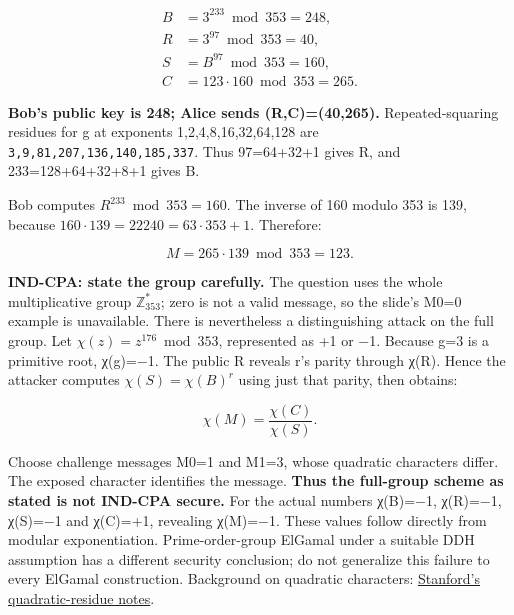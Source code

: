 \documentclass[11pt,a4paper]{article}
\begin{document}
\[
\begin{aligned}B&=3^{233}\bmod353=248,\\R&=3^{97}\bmod353=40,\\S&=B^{97}\bmod353=160,\\C&=123\cdot160\bmod353=265.\end{aligned}
\]

\textbf{Bob’s public key is 248; Alice sends (R,\allowbreak{}C)=\allowbreak{}(40,\allowbreak{}265).} Repeated-squaring residues for g at exponents 1,\allowbreak{}2,\allowbreak{}4,\allowbreak{}8,\allowbreak{}16,\allowbreak{}32,\allowbreak{}64,\allowbreak{}128 are \texttt{3,\allowbreak{}9,\allowbreak{}81,\allowbreak{}207,\allowbreak{}136,\allowbreak{}140,\allowbreak{}185,\allowbreak{}337}. Thus 97=\allowbreak{}64+32+1 gives R,\allowbreak{} and 233=\allowbreak{}128+64+32+8+1 gives B.


Bob computes \(R^{233}\bmod353=160\). The inverse of 160 modulo 353 is 139,\allowbreak{} because \(160\cdot139=22240=63\cdot353+1\). Therefore:



\[
M=265\cdot139\bmod353=123.
\]

\textbf{IND-CPA: state the group carefully.} The question uses the whole multiplicative group \(\mathbb Z_{353}^{*}\); zero is not a valid message,\allowbreak{} so the slide’s M0=\allowbreak{}0 example is unavailable. There is nevertheless a distinguishing attack on the full group. Let \(\chi(z)=z^{176}\bmod353\),\allowbreak{} represented as +1 or −1. Because g=\allowbreak{}3 is a primitive root,\allowbreak{} χ(g)=\allowbreak{}−1. The public R reveals r’s parity through χ(R). Hence the attacker computes \(\chi(S)=\chi(B)^r\) using just that parity,\allowbreak{} then obtains:



\[
\chi(M)=\frac{\chi(C)}{\chi(S)}.
\]

Choose challenge messages M0=\allowbreak{}1 and M1=\allowbreak{}3,\allowbreak{} whose quadratic characters differ. The exposed character identifies the message. \textbf{Thus the full-group scheme as stated is not IND-CPA secure.} For the actual numbers χ(B)=\allowbreak{}−1,\allowbreak{} χ(R)=\allowbreak{}−1,\allowbreak{} χ(S)=\allowbreak{}−1 and χ(C)=\allowbreak{}+1,\allowbreak{} revealing χ(M)=\allowbreak{}−1. These values follow directly from modular exponentiation. Prime-order-group ElGamal under a suitable DDH assumption has a different security conclusion; do not generalize this failure to every ElGamal construction. Background on quadratic characters: \href{https://crypto.stanford.edu/pbc/notes/numbertheory/qr.html}{Stanford’s quadratic-residue notes}.
\end{document}
